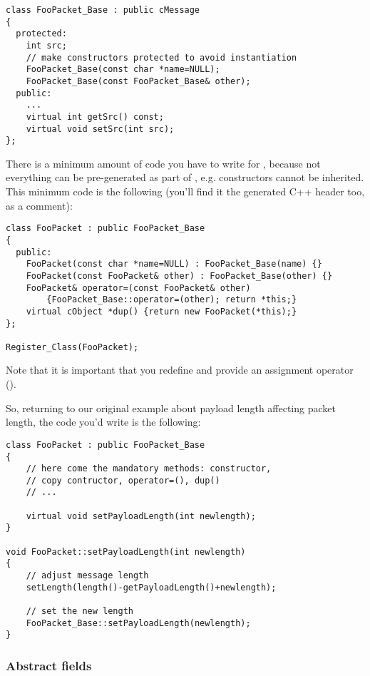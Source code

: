 \begin{verbatim}
class FooPacket_Base : public cMessage
{
  protected:
    int src;
    // make constructors protected to avoid instantiation
    FooPacket_Base(const char *name=NULL);
    FooPacket_Base(const FooPacket_Base& other);
  public:
    ...
    virtual int getSrc() const;
    virtual void setSrc(int src);
};
\end{verbatim}

There is a minimum amount of code you have to write
for , because not everything can be
pre-generated as part of , e.g.
constructors cannot be inherited. This minimum
code is the following (you'll find it the generated C++ header
too, as a comment):

\begin{verbatim}
class FooPacket : public FooPacket_Base
{
  public:
    FooPacket(const char *name=NULL) : FooPacket_Base(name) {}
    FooPacket(const FooPacket& other) : FooPacket_Base(other) {}
    FooPacket& operator=(const FooPacket& other)
        {FooPacket_Base::operator=(other); return *this;}
    virtual cObject *dup() {return new FooPacket(*this);}
};

Register_Class(FooPacket);
\end{verbatim}

Note that it is important that you redefine  and
provide an assignment operator ().

So, returning to our original example about payload length
affecting packet length, the code you'd write is the following:

\begin{verbatim}
class FooPacket : public FooPacket_Base
{
    // here come the mandatory methods: constructor,
    // copy contructor, operator=(), dup()
    // ...

    virtual void setPayloadLength(int newlength);
}

void FooPacket::setPayloadLength(int newlength)
{
    // adjust message length
    setLength(length()-getPayloadLength()+newlength);

    // set the new length
    FooPacket_Base::setPayloadLength(newlength);
}
\end{verbatim}



\subsubsection{Abstract fields}

